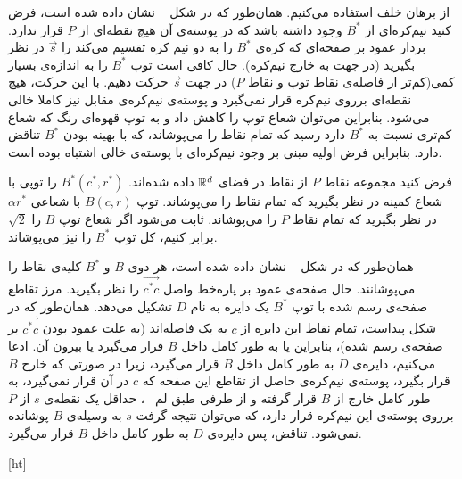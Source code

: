 
از برهان خلف استفاده می‌کنیم. همان‌طور که در شکل ~ نشان داده شده است، فرض کنید نیم‌کره‌ای از $B^*$ وجود داشته باشد که در پوسته‌ی آن هیچ نقطه‌ای از‌ $P$ قرار ندارد. بردار عمود بر صفحه‌ای که کره‌ی $B^*$ را به دو نیم کره تقسیم می‌کند را $\vec{s}$ در نظر بگیرید (در جهت به خارج نیم‌کره). حال کافی است توپ $B^*$ را به اندازه‌ی بسیار کمی(کم‌تر از فاصله‌ی نقاط توپ و نقاط $P$) در جهت $\vec{s}$ حرکت دهیم. با این حرکت، هیچ نقطه‌ای برروی نیم‌کره قرار نمی‌گیرد و پوسته‌ی نیم‌کره‌ی مقابل نیز کاملا خالی می‌شود. بنابراین می‌توان شعاع توپ را کاهش داد و به توپ قهوه‌ای رنگ که شعاع کم‌تری نسبت به $B^*$ دارد رسید که تمام نقاط را می‌پوشاند، که با بهینه بودن $B^*$ تناقض دارد. بنابراین فرض اولیه مبنی بر وجود نیم‌کره‌ای با پوسته‌ی خالی اشتباه بوده است.




فرض کنید مجموعه نقاط $P$ از نقاط در فضای $\mathbb{R}^d$ داده شده‌اند. $B^*(c^*, r^*)$ را توپی با شعاع کمینه در نظر بگیرید که تمام نقاط را می‌پوشاند. توپ $B(c, r)$ با شعاعی $\alpha r^*$ در نظر بگیرید که تمام نقاط $P$ را می‌پوشاند. ثابت می‌شود اگر شعاع توپ $B$ را $\sqrt{2}$ برابر کنیم، کل توپ $B^*$ را نیز می‌پوشاند. 


همان‌طور که در شکل ~ نشان داده شده است، هر دوی $B$ و $B^*$ کلیه‌ی نقاط را می‌پوشانند. حال صفحه‌ی عمود بر پاره‌خط واصل $\vec{c^*c}$ را نظر بگیرید. مرز تقاطع صفحه‌ی رسم شده با توپ $B^*$ یک دایره به نام $D$ تشکیل می‌دهد. همان‌طور که در شکل پیداست، تمام نقاط این دایره از $c$ به یک فاصله‌اند (به علت عمود بودن $\vec{c^*c}$ بر صفحه‌ی رسم شده)، بنابراین یا به طور کامل داخل $B$ قرار می‌گیرد یا بیرون آن. ادعا می‌کنیم، دایره‌ی $D$ به طور کامل داخل $B$ قرار می‌گیرد، زیرا در صورتی که خارج $B$ قرار بگیرد، پوسته‌ی نیم‌کره‌ی حاصل از تقاطع این صفحه که $c$ در آن قرار نمی‌گیرد، به طور کامل خارج از $B$ قرار گرفته و از طرفی طبق‌ لم ~، حداقل یک نقطه‌ی $s$ از $P$ برروی پوسته‌ی این نیم‌کره قرار دارد، که می‌توان نتیجه گرفت $s$ به وسیله‌ی $B$ پوشانده نمی‌شود. تناقض، پس دایره‌ی $D$ به طور کامل داخل $B$ قرار می‌گیرد. 

[ht]


